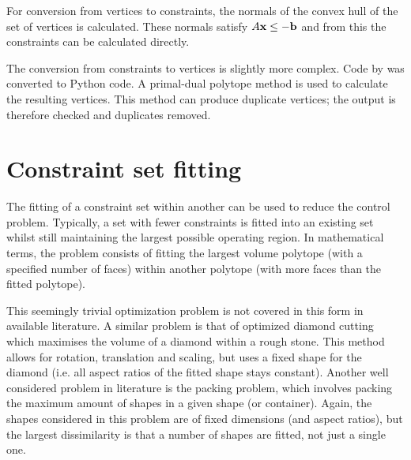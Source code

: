 For conversion from vertices to constraints, the normals of the convex hull of the set of vertices is calculated.
These normals satisfy $A{\bf {x}} \leq -{\bf {b}}$ \citep{qhulldocs} and from this the constraints can be calculated directly.

The conversion from constraints to vertices is slightly more complex.
Code by \citet{con2vert} was converted to Python code.
A primal-dual polytope method is used to calculate the resulting vertices.
This method can produce duplicate vertices; the output is therefore checked and duplicates removed.

\section{Constraint set fitting}\label{sec:confit}
The fitting of a constraint set within another can be used to reduce the control problem.
Typically, a set with fewer constraints is fitted into an existing set whilst still maintaining the largest possible operating region.
In mathematical terms, the problem consists of fitting the largest volume polytope (with a specified number of faces) within another polytope (with more faces than the fitted polytope).

This seemingly trivial optimization problem is not covered in this form in available literature.
A similar problem is that of optimized diamond cutting \citep{diamondcut} which maximises the volume of a diamond within a rough stone.
This method allows for rotation, translation and scaling, but uses a fixed shape for the diamond (i.e. all aspect ratios of the fitted shape stays constant).
Another well considered problem in literature is the packing problem, which involves packing the maximum amount of shapes in a given shape (or container).
Again, the shapes considered in this problem are of fixed dimensions (and aspect ratios), but the largest dissimilarity is that a number of shapes are fitted, not just a single one.

